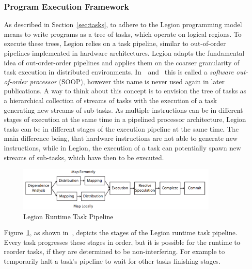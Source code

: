 \documentclass{article}      %
\begin{document}
\subsubsection{Program Execution Framework}
As described in Section~\ref{sec:tasks}, to adhere to the Legion programming model means to write programs as a tree of tasks, which operate on logical regions. To execute these trees, Legion relies on a task pipeline, similar to out-of-order pipelines implemented in hardware architectures. Legion adapts the fundamental idea of out-order-order pipelines and applies them on the coarser granularity of task execution in distributed environments. In~\cite{LegionPaper}~and~\cite{SlaughterThesis} this is called a \emph{software out-of-order processor} (SOOP), however this name is never used again in later publications. A way to think about this concept is to envision the tree of tasks as a hierarchical collection of streams of tasks with the execution of a task generating new streams of sub-tasks. As multiple instructions can be in different stages of execution at the same time in a pipelined processor architecture, Legion tasks can be in different stages of the execution pipeline at the same time. The main difference being, that hardware instructions are not able to generate new instructions, while in Legion, the execution of a task can potentially spawn new streams of sub-tasks, which have then to be executed.
\begin{figure}[htb]
	\centering
	\includegraphics[width=0.9\textwidth]{images/task_pipeline}
	\caption{Legion Runtime Task Pipeline}\label{fig:pipeline}
\end{figure}
Figure~\hyperref[fig:pipeline]{\ref{fig:pipeline}}, as shown in~\cite{BauerThesis}, depicts the stages of the Legion runtime task pipeline. Every task progresses these stages in order, but it is possible for the runtime to reorder tasks, if they are determined to be non-interfering. For example to temporarily halt a task's pipeline to wait for other tasks finishing stages.
\end{document}
